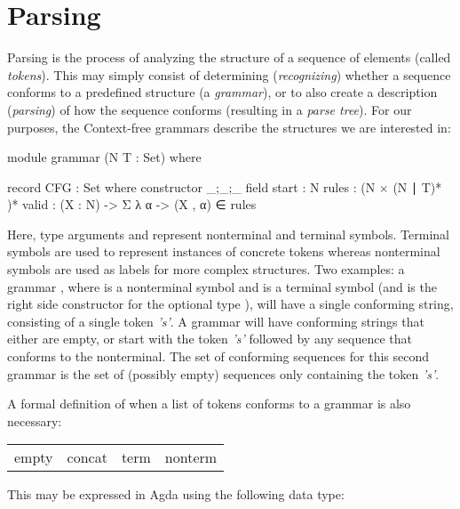 \chapter{Parsing}

	Parsing is the process of analyzing the structure of a sequence of elements
	(called \emph{tokens}). This may simply consist of determining
	(\emph{recognizing}) whether a sequence conforms to a predefined structure
	(a \emph{grammar}), or to also create a description (\emph{parsing}) of how
	the sequence conforms (resulting in a \emph{parse tree}). For our
	purposes, the Context-free grammars describe the structures we are
	interested in:
	
	\begin{code}

		module grammar (N T : Set) where

		record CFG : Set where
		  constructor _;_;_
		  field
		    start : N
		    rules : (N × (N ∣ T)* )*
    		valid : (X : N) -> Σ λ α -> (X , α) ∈ rules

	\end{code}

	Here, type arguments  and  represent nonterminal and
	terminal symbols. Terminal symbols are used to represent instances of
	concrete tokens whereas nonterminal symbols are used as labels for more
	complex structures. Two examples: a grammar , where  is a nonterminal symbol and  is a
	terminal symbol (and  is the right side constructor for the
	optional type \codett{|}), will have a single conforming string, consisting
	of a single token \emph{'s'}. A grammar  will have conforming strings that either are empty, or
	start with the token \emph{'s'} followed by any sequence that conforms to
	the  nonterminal. The set of conforming sequences for this second
	grammar is the set of (possibly empty) sequences only containing the token
	\emph{'s'}.

	A formal definition of when a list of tokens conforms to a grammar is also
	necessary:

	\begin{table}[h]
		\centering
		\begin{tabular}{cccc}
			 empty & concat & term & nonterm
		\end{tabular}
	\end{table}
	
	This may be expressed in Agda using the following data type:
	
